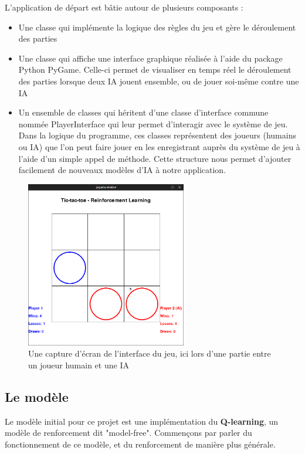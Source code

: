 \documentclass[french]{article}
\begin{document}
    L'application de départ est bâtie autour de plusieurs composants :
    \begin{itemize}
        \item Une classe qui implémente la logique des règles du jeu et gère le déroulement des parties
        \item Une classe qui affiche une interface graphique réalisée à l'aide du package Python PyGame. Celle-ci permet de visualiser en temps réel le déroulement des parties lorsque deux IA jouent ensemble, ou de jouer soi-même contre une IA
        \item Un ensemble de classes qui héritent d'une classe d'interface commune nommée PlayerInterface qui leur permet d'interagir avec le système de jeu. Dans la logique du programme, ces classes représentent des joueurs (humains ou IA) que l'on peut faire jouer en les enregistrant auprès du système de jeu à l'aide d'un simple appel de méthode. Cette structure nous permet d'ajouter facilement de nouveaux modèles d'IA à notre application.
    \end{itemize}

    \begin{figure}[h]
        \includegraphics[width=7cm]{game_screenshot}
        \centering
        \caption{Une capture d'écran de l'interface du jeu, ici lors d'une partie entre un joueur humain et une IA}
        \centering
    \end{figure}

    \subsection{Le modèle}
    Le modèle initial pour ce projet est une implémentation du \textbf{Q-learning}, un modèle de renforcement dit "model-free". Commençons par parler du fonctionnement de ce modèle, et du renforcement de manière plus générale.
\end{document}
